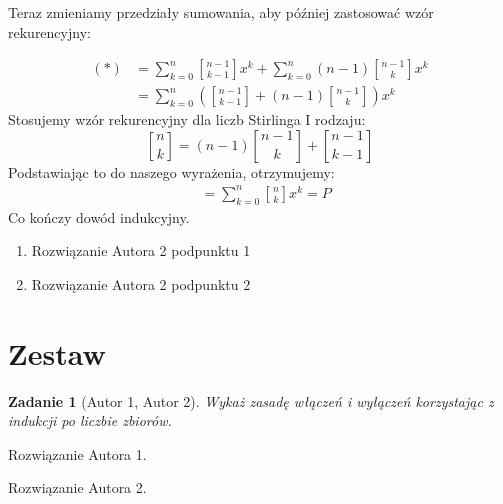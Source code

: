 \documentclass{mwart}
\newtheorem{zad}{Zadanie}[section]
\begin{document}
\begin{mdframed}
\begin{enumerate}
              Teraz zmieniamy przedziały sumowania, aby później zastosować wzór rekurencyjny:

              \begin{align*}
                  (*) & = \sum_{k=0}^{n} \genfrac{[}{]}{0pt}{1}{n-1}{k-1} x^k + \sum_{k=0}^{n} (n-1) \genfrac{[}{]}{0pt}{1}{n-1}{k} x^k \\
                      & = \sum_{k=0}^{n} \left(\genfrac{[}{]}{0pt}{1}{n-1}{k-1} + (n-1) \genfrac{[}{]}{0pt}{1}{n-1}{k}\right) x^k
              \end{align*}
              Stosujemy wzór rekurencyjny dla liczb Stirlinga I rodzaju:
              $$\genfrac{[}{]}{0pt}{1}{n}{k} = (n-1)\genfrac{[}{]}{0pt}{1}{n-1}{k} + \genfrac{[}{]}{0pt}{1}{n-1}{k-1}$$
              Podstawiając to do naszego wyrażenia, otrzymujemy:
              \begin{align*}
                   & = \sum_{k=0}^{n} \genfrac{[}{]}{0pt}{1}{n}{k} x^k = P
              \end{align*}
              Co kończy dowód indukcyjny.
    \end{enumerate}
\end{mdframed}
\begin{mdframed}
    \begin{enumerate}
        \item Rozwiązanie Autora 2 podpunktu 1
        \item Rozwiązanie Autora 2 podpunktu 2
    \end{enumerate}
\end{mdframed}















\newpage
\section{Zestaw}          %

\begin{zad}[Autor 1, Autor 2]
    Wykaż zasadę włączeń i wyłączeń korzystając z indukcji po liczbie zbiorów.
\end{zad}
\begin{mdframed}
    Rozwiązanie Autora 1.
\end{mdframed}
\begin{mdframed}
    Rozwiązanie Autora 2.
\end{mdframed}
\end{document}
